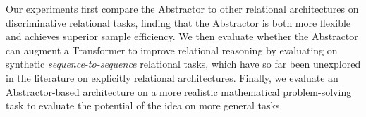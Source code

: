 Our experiments first compare the Abstractor to other relational architectures on discriminative relational tasks, finding that the Abstractor is both more flexible and achieves superior sample efficiency. We then evaluate whether the Abstractor can augment a Transformer to improve relational reasoning by evaluating on synthetic \textit{sequence-to-sequence} relational tasks, which have so far been unexplored in the literature on explicitly relational architectures. Finally, we evaluate an Abstractor-based architecture on a more realistic mathematical problem-solving task to evaluate the potential of the idea on more general tasks.
